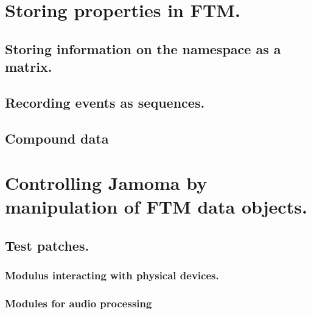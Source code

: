 \documentclass{article}
\begin{document}
%

\section{Storing properties in FTM.}

\subsection{Storing information on the namespace as a matrix.}

\subsection{Recording events as sequences.}

\subsection{Compound data}


%

\section{Controlling Jamoma by manipulation of FTM data objects.}

\subsection{Test patches.}

\subsubsection{Modulus interacting with physical devices.}


\subsubsection{Modules for audio processing}




%
\end{document}
